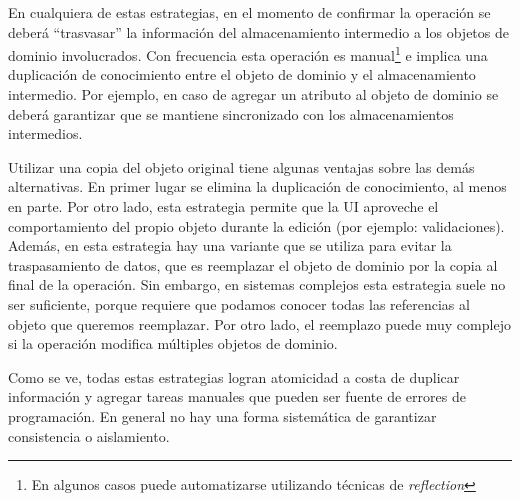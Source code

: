 	En cualquiera de estas estrategias, en el momento de confirmar la operación se
	deberá ``trasvasar'' la información del almacenamiento intermedio a los objetos
	de dominio involucrados.
	Con frecuencia esta operación es manual\footnote{En algunos casos puede automatizarse utilizando
	técnicas de \emph{reflection}} e implica una duplicación de conocimiento entre
	el objeto de dominio y el almacenamiento intermedio. Por ejemplo, en caso de
	agregar un atributo al objeto de dominio se deberá garantizar que se mantiene
	sincronizado con los almacenamientos intermedios.
	
	Utilizar una copia del objeto original tiene algunas ventajas sobre las demás
	alternativas. En primer lugar se elimina la duplicación de
	conocimiento, al menos en parte. Por otro lado, esta estrategia permite que la
	UI aproveche el comportamiento del propio objeto durante la edición (por
	ejemplo: validaciones). Además, en esta estrategia hay una variante que se
	utiliza para evitar la traspasamiento de datos, que es reemplazar el objeto de
	dominio por la copia al final de la operación. Sin embargo, en sistemas
	complejos esta estrategia suele no ser suficiente, porque requiere que podamos
	conocer todas las referencias al objeto que queremos reemplazar. Por otro lado,
	el reemplazo puede muy complejo si la operación modifica múltiples objetos de
	dominio.

	Como se ve, todas estas estrategias logran atomicidad a costa de duplicar
	información y agregar tareas manuales que pueden ser fuente de errores de
	programación. En general no hay una forma sistemática de
	garantizar consistencia o aislamiento.
	